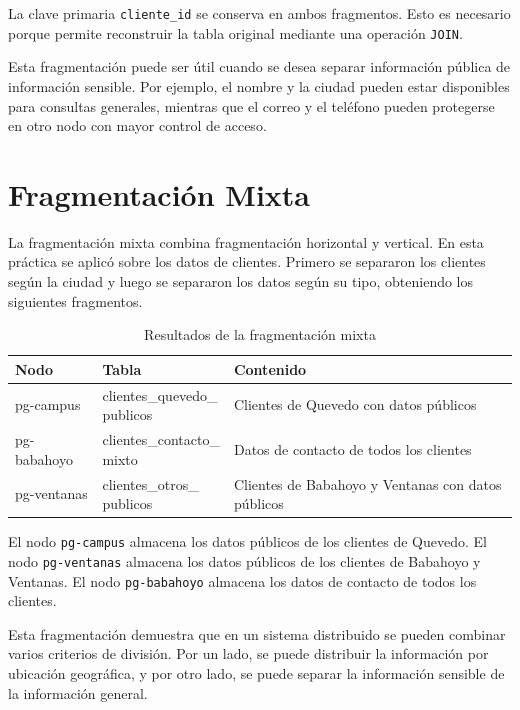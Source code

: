 \documentclass[conference]{IEEEtran}
\begin{document}
La clave primaria \texttt{cliente\_id} se conserva en ambos fragmentos. Esto es necesario porque permite reconstruir la tabla original mediante una operación \texttt{JOIN}.

Esta fragmentación puede ser útil cuando se desea separar información pública de información sensible. Por ejemplo, el nombre y la ciudad pueden estar disponibles para consultas generales, mientras que el correo y el teléfono pueden protegerse en otro nodo con mayor control de acceso.

\section{Fragmentación Mixta}
La fragmentación mixta combina fragmentación horizontal y vertical. En esta práctica se aplicó sobre los datos de clientes. Primero se separaron los clientes según la ciudad y luego se separaron los datos según su tipo, obteniendo los siguientes fragmentos.

\begin{table}[htbp]
\caption{Resultados de la fragmentación mixta}
\label{tab:mixta}
\centering
\begin{tabular}{@{}lll@{}}
\toprule
\textbf{Nodo} & \textbf{Tabla} & \textbf{Contenido} \\
\midrule
pg-campus & \makecell[l]{clientes\_quevedo\_\\publicos} & Clientes de Quevedo con datos públicos \\
pg-babahoyo & \makecell[l]{clientes\_contacto\_\\mixto} & Datos de contacto de todos los clientes \\
pg-ventanas & \makecell[l]{clientes\_otros\_\\publicos} & Clientes de Babahoyo y Ventanas con datos públicos \\
\bottomrule
\end{tabular}
\end{table}

El nodo \texttt{pg-campus} almacena los datos públicos de los clientes de Quevedo. El nodo \texttt{pg-ventanas} almacena los datos públicos de los clientes de Babahoyo y Ventanas. El nodo \texttt{pg-babahoyo} almacena los datos de contacto de todos los clientes.

Esta fragmentación demuestra que en un sistema distribuido se pueden combinar varios criterios de división. Por un lado, se puede distribuir la información por ubicación geográfica, y por otro lado, se puede separar la información sensible de la información general.
\end{document}
